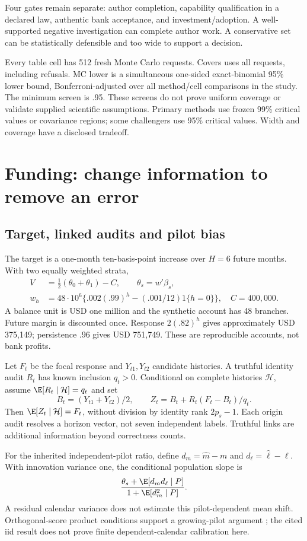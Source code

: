 Four gates remain separate: author completion, capability qualification in a declared law, authentic bank acceptance, and investment/adoption. A well-supported negative investigation can complete author work. A conservative set can be statistically defensible and too wide to support a decision.

Every table cell has 512 fresh Monte Carlo requests. Covers uses all requests, including refusals. MC lower is a simultaneous one-sided exact-binomial 95\% lower bound, Bonferroni-adjusted over all method/cell comparisons in the study. The minimum screen is .95. These screens do not prove uniform coverage or validate supplied scientific assumptions. Primary methods use frozen 99\% critical values or covariance regions; some challengers use 95\% critical values. Width and coverage have a disclosed tradeoff.

\section{Funding: change information to remove an error}
\subsection{Target, linked audits and pilot bias}
The target is a one-month ten-basis-point increase over $H=6$ future months. With two equally weighted strata,
\[
 \begin{aligned}
 V&=\tfrac12(\theta_0+\theta_1)-C,\qquad \theta_s=w'\beta_s,\\
 w_h&=48\cdot10^6\{.002(.99)^h-(.001/12)1\{h=0\}\},\quad C=400{,}000.
\end{aligned}
\]
A balance unit is USD one million and the synthetic account has 48 branches. Future margin is discounted once. Response $2(.82)^h$ gives approximately USD 375,149; persistence .96 gives USD 751,749. These are reproducible accounts, not bank profits.

Let $F_t$ be the focal response and $Y_{t1},Y_{t2}$ candidate histories. A truthful identity audit $R_t$ has known inclusion $q_t>0$. Conditional on complete histories $\mathcal H$, assume $\E[R_t\mid\mathcal H]=q_t$ and set
\[
 B_t=(Y_{t1}+Y_{t2})/2,\qquad Z_t=B_t+R_t(F_t-B_t)/q_t.
\]
Then $\E[Z_t\mid\mathcal H]=F_t$, without division by identity rank $2p_s-1$. Each origin audit resolves a horizon vector, not seven independent labels. Truthful links are additional information beyond correctness counts.

For the inherited independent-pilot ratio, define $d_m=\widehat m-m$ and $d_\ell=\widehat\ell-\ell$. With innovation variance one, the conditional population slope is
\[
 \frac{\theta_s+\E[d_md_\ell\mid P]}{1+\E[d_m^2\mid P]}.
\]
A residual calendar variance does not estimate this pilot-dependent mean shift. Orthogonal-score product conditions support a growing-pilot argument \cite{dml2018}; the cited iid result does not prove finite dependent-calendar calibration here.

